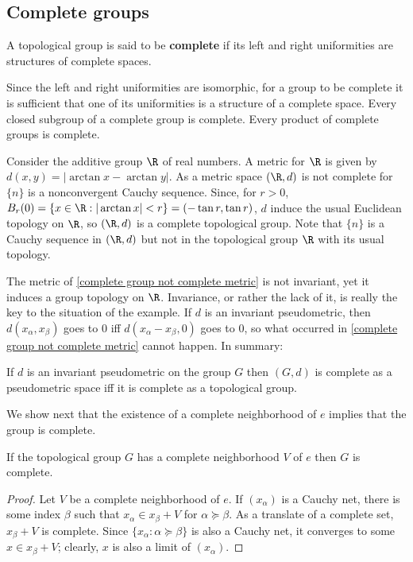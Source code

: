\subsection{Complete groups}
\begin{definition}
A topological group is said to be \textbf{complete} if its left and right uniformities are structures of complete spaces.
\end{definition}
Since the left and right uniformities are isomorphic, for a group to be complete it is sufficient that one of its uniformities is a structure of a complete space. Every closed subgroup of a complete group is complete. Every product of complete groups is complete.
\begin{example}\label{complete group not complete metric}
Consider the additive group $\R$ of real numbers. A metric for $\R$ is given by $d(x,y)=|\arctan x-\arctan y|$. As a metric space $(\R,d)$ is not complete for $\{n\}$ is a nonconvergent Cauchy sequence. Since, for $r>0$, $B_r(0)=\{x\in\R:|\arctan x|<r\}=(-\tan r,\tan r)$, $d$ induce the usual Euclidean topology on $\R$, so $(\R,d)$ is a complete topological group. Note that $\{n\}$ is a Cauchy sequence in $(\R,d)$ but not in the topological group $\R$ with its usual topology.
\end{example}
The metric of \cref{complete group not complete metric} is not invariant, yet it induces a group topology on $\R$. Invariance, or rather the lack of it, is really the key to the situation of the example. If $d$ is an invariant pseudometric, then $d(x_\alpha,x_\beta)$ goes to $0$ iff $d(x_\alpha-x_\beta,0)$ goes to $0$, so what occurred in \cref{complete group not complete metric} cannot happen. In summary:
\begin{proposition}
If $d$ is an invariant pseudometric on the group $G$ then $(G,d)$ is complete as a pseudometric space iff it is complete as a topological group.
\end{proposition}
We show next that the existence of a complete neighborhood of $e$ implies
that the group is complete.
\begin{proposition}\label{topological group complete nbhd is complete}
If the topological group $G$ has a complete neighborhood $V$ of $e$ then $G$ is complete.
\end{proposition}
\begin{proof}
Let $V$ be a complete neighborhood of $e$. If $(x_\alpha)$ is a Cauchy net, there is some index $\beta$ such that $x_\alpha\in x_\beta+V$ for $\alpha\succeq\beta$. As a translate of a complete set, $x_\beta+V$ is complete. Since $\{x_\alpha:\alpha\succeq\beta\}$ is also a Cauchy net, it converges to some $x\in x_\beta+V$; clearly, $x$ is also a limit of $(x_\alpha)$.
\end{proof}
